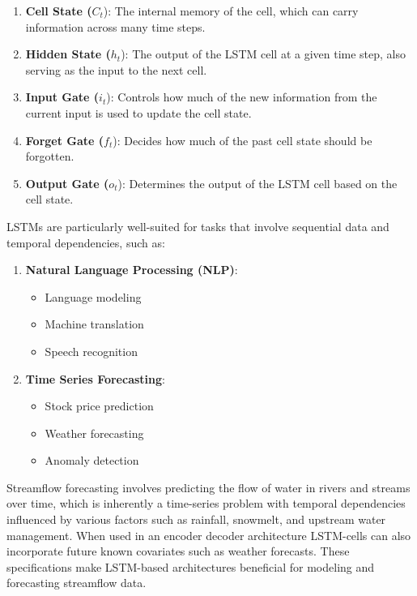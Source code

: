 \documentclass[
]{krantz}
\providecommand{\tightlist}{%
  \setlength{\itemsep}{0pt}\setlength{\parskip}{0pt}}
\begin{document}
\begin{enumerate}
\def\labelenumi{\arabic{enumi}.}
\tightlist
\item
  \textbf{Cell State (}\(C_t\)): The internal memory of the cell, which can carry information across many time steps.
\item
  \textbf{Hidden State (}\(h_t\)): The output of the LSTM cell at a given time step, also serving as the input to the next cell.
\item
  \textbf{Input Gate (}\(i_t\)): Controls how much of the new information from the current input is used to update the cell state.
\item
  \textbf{Forget Gate (}\(f_t\)): Decides how much of the past cell state should be forgotten.
\item
  \textbf{Output Gate (}\(o_t\)): Determines the output of the LSTM cell based on the cell state.
\end{enumerate}

LSTMs are particularly well-suited for tasks that involve sequential data and temporal dependencies, such as:

\begin{enumerate}
\def\labelenumi{\arabic{enumi}.}
\tightlist
\item
  \textbf{Natural Language Processing (NLP)}:

  \begin{itemize}
  \tightlist
  \item
    Language modeling
  \item
    Machine translation
  \item
    Speech recognition
  \end{itemize}
\item
  \textbf{Time Series Forecasting}:

  \begin{itemize}
  \tightlist
  \item
    Stock price prediction
  \item
    Weather forecasting
  \item
    Anomaly detection
  \end{itemize}
\end{enumerate}

Streamflow forecasting involves predicting the flow of water in rivers and streams over time, which is inherently a time-series problem with temporal dependencies influenced by various factors such as rainfall, snowmelt, and upstream water management. When used in an encoder decoder architecture LSTM-cells can also incorporate future known covariates such as weather forecasts. These specifications make LSTM-based architectures beneficial for modeling and forecasting streamflow data.
\end{document}
